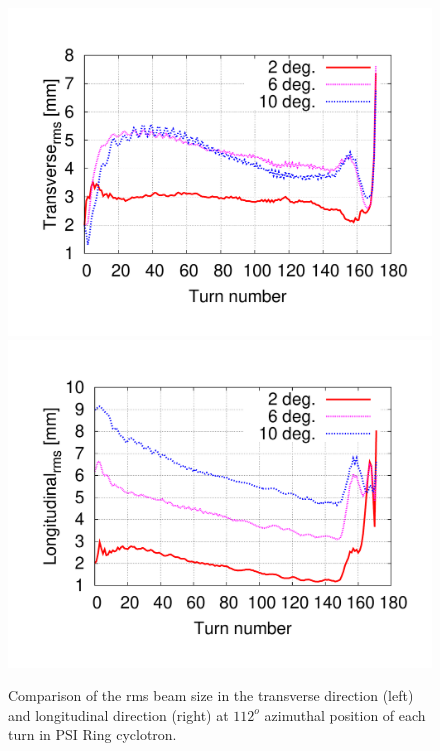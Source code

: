 \documentclass[aps,prstab,twocolumn,superscriptaddress]{revtex4}
\begin{document}
\begin{figure}
  \includegraphics[width=0.45\linewidth]{figures/Comp-Transverse.pdf}
  \includegraphics[width=0.45\linewidth]{figures/Comp-Longitudinal.pdf}
  \caption{Comparison of the rms beam size in the transverse direction (left) and longitudinal direction (right) at $112^o$ azimuthal position of each turn 
    in PSI Ring cyclotron. }
  \label{fig:RMSsize}
\end{figure}
\end{document}
